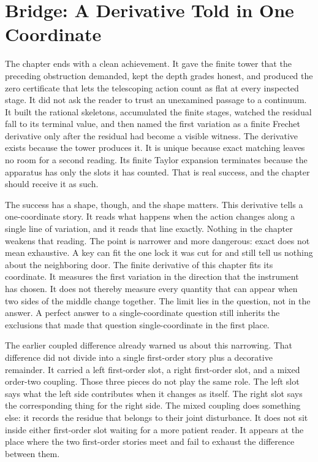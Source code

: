 \section*{Bridge: A Derivative Told in One Coordinate}

The chapter ends with a clean achievement. It gave the finite tower that the
preceding obstruction demanded, kept the depth grades honest, and produced the
zero certificate that lets the telescoping action count as flat at every
inspected stage. It did not ask the reader to trust an unexamined passage to a
continuum. It built the rational skeletons, accumulated the finite stages,
watched the residual fall to its terminal value, and then named the first
variation as a finite Frechet derivative only after the residual had become a
visible witness. The derivative exists because the tower produces it. It is
unique because exact matching leaves no room for a second reading. Its finite
Taylor expansion terminates because the apparatus has only the slots it has
counted. That is real success, and the chapter should receive it as such.

The success has a shape, though, and the shape matters. This derivative tells a
one-coordinate story. It reads what happens when the action changes along a
single line of variation, and it reads that line exactly. Nothing in the
chapter weakens that reading. The point is narrower and more dangerous: exact
does not mean exhaustive. A key can fit the one lock it was cut for and still
tell us nothing about the neighboring door. The finite derivative of this
chapter fits its coordinate. It measures the first variation in the direction
that the instrument has chosen. It does not thereby measure every quantity that
can appear when two sides of the middle change together. The limit lies in the
question, not in the answer. A perfect answer to a single-coordinate question
still inherits the exclusions that made that question single-coordinate in the
first place.

The earlier coupled difference already warned us about this narrowing. That
difference did not divide into a single first-order story plus a decorative
remainder. It carried a left first-order slot, a right first-order slot, and a
mixed order-two coupling. Those three pieces do not play the same role. The
left slot says what the left side contributes when it changes as itself. The
right slot says the corresponding thing for the right side. The mixed coupling
does something else: it records the residue that belongs to their joint
disturbance. It does not sit inside either first-order slot waiting for a more
patient reader. It appears at the place where the two first-order stories meet
and fail to exhaust the difference between them.

